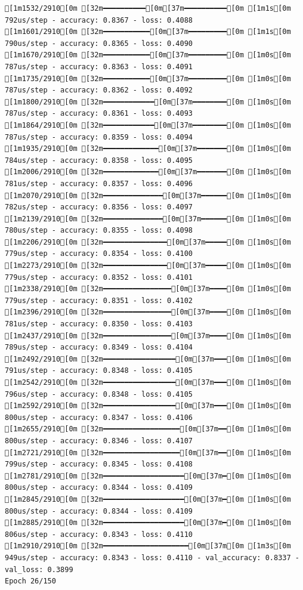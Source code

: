 \documentclass[
  letterpaper,
  DIV=11,
  numbers=noendperiod]{scrartcl}
\begin{document}
\begin{verbatim}
[1m1532/2910[0m [32m━━━━━━━━━━[0m[37m━━━━━━━━━━[0m [1m1s[0m 792us/step - accuracy: 0.8367 - loss: 0.4088
[1m1601/2910[0m [32m━━━━━━━━━━━[0m[37m━━━━━━━━━[0m [1m1s[0m 790us/step - accuracy: 0.8365 - loss: 0.4090
[1m1670/2910[0m [32m━━━━━━━━━━━[0m[37m━━━━━━━━━[0m [1m0s[0m 787us/step - accuracy: 0.8363 - loss: 0.4091
[1m1735/2910[0m [32m━━━━━━━━━━━[0m[37m━━━━━━━━━[0m [1m0s[0m 787us/step - accuracy: 0.8362 - loss: 0.4092
[1m1800/2910[0m [32m━━━━━━━━━━━━[0m[37m━━━━━━━━[0m [1m0s[0m 787us/step - accuracy: 0.8361 - loss: 0.4093
[1m1864/2910[0m [32m━━━━━━━━━━━━[0m[37m━━━━━━━━[0m [1m0s[0m 787us/step - accuracy: 0.8359 - loss: 0.4094
[1m1935/2910[0m [32m━━━━━━━━━━━━━[0m[37m━━━━━━━[0m [1m0s[0m 784us/step - accuracy: 0.8358 - loss: 0.4095
[1m2006/2910[0m [32m━━━━━━━━━━━━━[0m[37m━━━━━━━[0m [1m0s[0m 781us/step - accuracy: 0.8357 - loss: 0.4096
[1m2070/2910[0m [32m━━━━━━━━━━━━━━[0m[37m━━━━━━[0m [1m0s[0m 782us/step - accuracy: 0.8356 - loss: 0.4097
[1m2139/2910[0m [32m━━━━━━━━━━━━━━[0m[37m━━━━━━[0m [1m0s[0m 780us/step - accuracy: 0.8355 - loss: 0.4098
[1m2206/2910[0m [32m━━━━━━━━━━━━━━━[0m[37m━━━━━[0m [1m0s[0m 779us/step - accuracy: 0.8354 - loss: 0.4100
[1m2273/2910[0m [32m━━━━━━━━━━━━━━━[0m[37m━━━━━[0m [1m0s[0m 779us/step - accuracy: 0.8352 - loss: 0.4101
[1m2338/2910[0m [32m━━━━━━━━━━━━━━━━[0m[37m━━━━[0m [1m0s[0m 779us/step - accuracy: 0.8351 - loss: 0.4102
[1m2396/2910[0m [32m━━━━━━━━━━━━━━━━[0m[37m━━━━[0m [1m0s[0m 781us/step - accuracy: 0.8350 - loss: 0.4103
[1m2437/2910[0m [32m━━━━━━━━━━━━━━━━[0m[37m━━━━[0m [1m0s[0m 789us/step - accuracy: 0.8349 - loss: 0.4104
[1m2492/2910[0m [32m━━━━━━━━━━━━━━━━━[0m[37m━━━[0m [1m0s[0m 791us/step - accuracy: 0.8348 - loss: 0.4105
[1m2542/2910[0m [32m━━━━━━━━━━━━━━━━━[0m[37m━━━[0m [1m0s[0m 796us/step - accuracy: 0.8348 - loss: 0.4105
[1m2592/2910[0m [32m━━━━━━━━━━━━━━━━━[0m[37m━━━[0m [1m0s[0m 800us/step - accuracy: 0.8347 - loss: 0.4106
[1m2655/2910[0m [32m━━━━━━━━━━━━━━━━━━[0m[37m━━[0m [1m0s[0m 800us/step - accuracy: 0.8346 - loss: 0.4107
[1m2721/2910[0m [32m━━━━━━━━━━━━━━━━━━[0m[37m━━[0m [1m0s[0m 799us/step - accuracy: 0.8345 - loss: 0.4108
[1m2781/2910[0m [32m━━━━━━━━━━━━━━━━━━━[0m[37m━[0m [1m0s[0m 800us/step - accuracy: 0.8344 - loss: 0.4109
[1m2845/2910[0m [32m━━━━━━━━━━━━━━━━━━━[0m[37m━[0m [1m0s[0m 800us/step - accuracy: 0.8344 - loss: 0.4109
[1m2885/2910[0m [32m━━━━━━━━━━━━━━━━━━━[0m[37m━[0m [1m0s[0m 806us/step - accuracy: 0.8343 - loss: 0.4110
[1m2910/2910[0m [32m━━━━━━━━━━━━━━━━━━━━[0m[37m[0m [1m3s[0m 949us/step - accuracy: 0.8343 - loss: 0.4110 - val_accuracy: 0.8337 - val_loss: 0.3899
Epoch 26/150


\end{verbatim}
\end{document}
